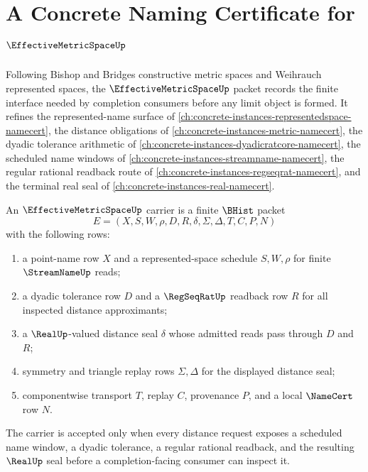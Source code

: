 \chapter{A Concrete Naming Certificate for $\EffectiveMetricSpaceUp$}
\label{ch:concrete-instances-effective-metric-space-namecert}

Following Bishop and Bridges constructive metric spaces and Weihrauch represented spaces, the $\EffectiveMetricSpaceUp$ packet records the finite interface needed by completion consumers before any limit object is formed. It refines the represented-name surface of \autoref{ch:concrete-instances-representedspace-namecert}, the distance obligations of \autoref{ch:concrete-instances-metric-namecert}, the dyadic tolerance arithmetic of \autoref{ch:concrete-instances-dyadicratcore-namecert}, the scheduled name windows of \autoref{ch:concrete-instances-streamname-namecert}, the regular rational readback route of \autoref{ch:concrete-instances-regseqrat-namecert}, and the terminal real seal of \autoref{ch:concrete-instances-real-namecert}.

\begin{definition}
\label{def:effective-metric-space-carrier}
An $\EffectiveMetricSpaceUp$ carrier is a finite $\BHist$ packet
$$
E=(X,S,W,\rho,D,R,\delta,\Sigma,\Delta,T,C,P,N)
$$
with the following rows:
\begin{enumerate}
  \item a point-name row $X$ and a represented-space schedule $S,W,\rho$ for finite $\StreamNameUp$ reads;
  \item a dyadic tolerance row $D$ and a $\RegSeqRatUp$ readback row $R$ for all inspected distance approximants;
  \item a $\RealUp$-valued distance seal $\delta$ whose admitted reads pass through $D$ and $R$;
  \item symmetry and triangle replay rows $\Sigma,\Delta$ for the displayed distance seal;
  \item componentwise transport $T$, replay $C$, provenance $P$, and a local $\NameCert$ row $N$.
\end{enumerate}
The carrier is accepted only when every distance request exposes a scheduled name window, a dyadic tolerance, a regular rational readback, and the resulting $\RealUp$ seal before a completion-facing consumer can inspect it.
\end{definition}

